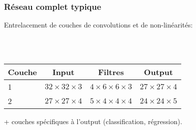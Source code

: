 \documentclass{formation}
\begin{document}
\begin{frame}
  \frametitle{Réseau complet typique}
  Entrelacement de couches de convolutions et de non-linéarités:\\
  \begin{figure}
    \raisebox{-0.5\height}{Première couche:}
    \raisebox{-0.5\height}{$\ReLU$}
    \raisebox{-0.5\height}{\Huge(}
    \raisebox{-0.5\height}{\huge(}
    \raisebox{-0.5\height}{\huge)}
    \raisebox{-0.5\height}{\Huge)}
    \raisebox{-0.5\height}{=}
    \\
    \raisebox{-0.5\height}{Deuxième couche:}
    \raisebox{-0.5\height}{$\ReLU$}
    \raisebox{-0.5\height}{\Huge(}
    \raisebox{-0.5\height}{\huge(}
    \raisebox{-0.5\height}{\huge)}
    \raisebox{-0.5\height}{\Huge)}
    \raisebox{-0.5\height}{=}
    \\
  \end{figure}
  \begin{table}
    \centering
    \begin{tabular}{lccc}
      \toprule
      Couche & Input &  Filtres & Output \\
      \midrule
      1 & $32 \times 32 \times 3$ & $4 \times 6 \times 6 \times 3$ & $27
                                                                     \times
                                                                     27
                                                                     \times
                                                                     4$
      \\
      2 & $27 \times 27 \times 4$ & $5 \times 4 \times 4 \times 4$ & $24
                                                                     \times
                                                                     24
                                                                     \times
                                                                     5$
      \\
      \bottomrule
      
    \end{tabular}
  \end{table}
  + couches spécifiques à l'output (classification, régression).
\end{frame}
\end{document}
